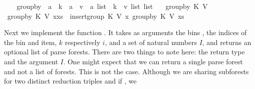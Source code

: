 \begin{isabellebody}
\ \ {\isacharparenright}{\kern0pt}{\isachardoublequoteclose}\isanewline
\isanewline
{}\isamarkupfalse%
\ group{\isacharunderscore}{\kern0pt}by\ {\isacharcolon}{\kern0pt}{\isacharcolon}{\kern0pt}\ {\isachardoublequoteopen}{\isacharparenleft}{\kern0pt}{\isacharprime}{\kern0pt}a\ {\isasymRightarrow}\ {\isacharprime}{\kern0pt}k{\isacharparenright}{\kern0pt}\ {\isasymRightarrow}\ {\isacharparenleft}{\kern0pt}{\isacharprime}{\kern0pt}a\ {\isasymRightarrow}\ {\isacharprime}{\kern0pt}v{\isacharparenright}{\kern0pt}\ {\isasymRightarrow}\ {\isacharprime}{\kern0pt}a\ list\ {\isasymRightarrow}\ {\isacharparenleft}{\kern0pt}{\isacharprime}{\kern0pt}k\ {\isasymtimes}\ {\isacharprime}{\kern0pt}v\ list{\isacharparenright}{\kern0pt}\ list{\isachardoublequoteclose}\ \isanewline
\ \ {\isachardoublequoteopen}group{\isacharunderscore}{\kern0pt}by\ K\ V\ {\isacharbrackleft}{\kern0pt}{\isacharbrackright}{\kern0pt}\ {\isacharequal}{\kern0pt}\ {\isacharbrackleft}{\kern0pt}{\isacharbrackright}{\kern0pt}{\isachardoublequoteclose}\isanewline
{\isacharbar}{\kern0pt}\ {\isachardoublequoteopen}group{\isacharunderscore}{\kern0pt}by\ K\ V\ {\isacharparenleft}{\kern0pt}x{\isacharhash}{\kern0pt}xs{\isacharparenright}{\kern0pt}\ {\isacharequal}{\kern0pt}\ insert{\isacharunderscore}{\kern0pt}group\ K\ V\ x\ {\isacharparenleft}{\kern0pt}group{\isacharunderscore}{\kern0pt}by\ K\ V\ xs{\isacharparenright}{\kern0pt}{\isachardoublequoteclose}\isanewline
%
\isadelimproof
%
\endisadelimproof
%
\isatagproof
%
\endisatagproof
{\isafoldproof}%
%
\isadelimproof
%
\endisadelimproof
%
\begin{isamarkuptext}%
Next we implement the function . It takes as arguments the bins , the indices of the bin and
item, $k$ respectively $i$, and a set of natural numbers $I$, and returns an optional list of parse forests.
There are two things to note here: the return type and the argument $I$. One might expect that we can return
a single parse forest and not a list of forests. This is not the case. Although we are sharing subforests for two distinct reduction triples
 and  if , we

\end{isamarkuptext}
\end{isabellebody}
